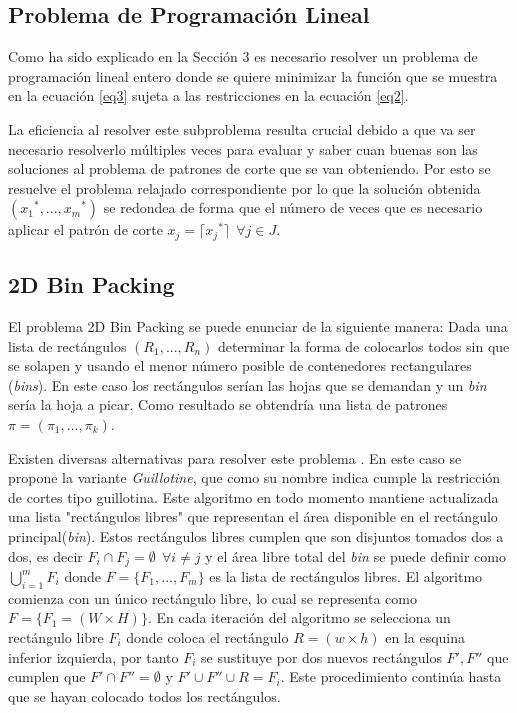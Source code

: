 \documentclass[a4paper,10pt,twocolumn]{article}
\begin{document}
\subsection{Problema de Programación Lineal}
Como ha sido explicado en la Sección 3 es necesario resolver un problema de programación lineal entero donde se quiere minimizar la función que se muestra en la ecuación \eqref{eq3} sujeta a las restricciones en la ecuación \eqref{eq2}.

La eficiencia al resolver este subproblema resulta crucial debido a que va ser necesario resolverlo múltiples veces para evaluar y saber cuan buenas son las soluciones al problema de patrones de corte que se van obteniendo. Por esto se resuelve el problema relajado correspondiente por lo que la solución obtenida $({x_1}^*,...,{x_m}^*)$ se redondea de forma que el número de veces que es necesario aplicar el patrón de corte $x_j = \lceil {x_j}^* \rceil \ \ \forall j \in J$.

\subsection{2D Bin Packing}
El problema 2D Bin Packing se puede enunciar de la siguiente manera: Dada una lista de rectángulos $(R_1,...,R_n)$ determinar la forma de colocarlos todos sin que se solapen y usando el menor número posible de contenedores rectangulares (\textit{bins}). En este caso los rectángulos serían las hojas que se demandan y un \textit{bin} sería la hoja a picar. Como resultado se obtendría una lista de patrones $\pi = (\pi_1,...,\pi_k)$.

Existen diversas alternativas para resolver este problema \cite{11}. En este caso se propone la variante \textit{Guillotine}, que como su nombre indica cumple la restricción de cortes tipo guillotina. Este algoritmo en todo momento mantiene actualizada una lista "rectángulos libres" que representan el área disponible en el rectángulo principal(\textit{bin}). Estos rectángulos libres cumplen que son disjuntos tomados dos a dos, es decir $F_i \cap F_j = \emptyset \ \ \forall i\neq j $ y el área libre total del \textit{bin} se puede definir como $\bigcup\limits_{i=1}^{m} F_{i}$ donde $F = \{F_1,...,F_m\}$ es la lista de rectángulos libres. El algoritmo comienza con un único rectángulo libre, lo cual se representa como $F = \{F_1 = (W \times H)\}$. En cada iteración del algoritmo se selecciona un rectángulo libre $F_i$ donde coloca el rectángulo $R = (w \times h)$ en la esquina inferior izquierda, por tanto $F_i$ se sustituye por dos nuevos rectángulos $F',F''$ que cumplen que $F' \cap F'' = \emptyset$ y $F' \cup F'' \cup R = F_i$. Este procedimiento continúa hasta que se hayan colocado todos los rectángulos.
\end{document}
